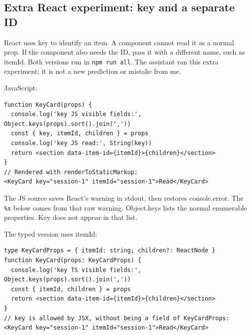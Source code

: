 \documentclass[
  10pt,
  a4paper,
]{article}
\begin{document}
\subsection{Extra React experiment: key and a separate
ID}\label{extra-react-experiment-key-and-a-separate-id}

React uses key to identify an item. A component cannot read it as a
normal prop. If the component also needs the ID, pass it with a
different name, such as itemId. Both versions run in
\texttt{npm run all}. The assistant ran this extra experiment; it is not
a new prediction or mistake from me.


JavaScript:

\begin{minipage}{\linewidth}

\begin{lstlisting}
function KeyCard(props) {
  console.log('key JS visible fields:', Object.keys(props).sort().join(','))
  const { key, itemId, children } = props
  console.log('key JS read:', String(key))
  return <section data-item-id={itemId}>{children}</section>
}
// Rendered with renderToStaticMarkup:
<KeyCard key="session-1" itemId="session-1">Read</KeyCard>
\end{lstlisting}

\end{minipage}\par

The JS source saves React's warning in stdout, then restores
console.error. The \texttt{\%s} below comes from that raw warning.
Object.keys lists the normal enumerable properties. Key does not appear
in that list.

The typed version uses itemId:

\begin{minipage}{\linewidth}

\begin{lstlisting}
type KeyCardProps = { itemId: string; children?: ReactNode }
function KeyCard(props: KeyCardProps) {
  console.log('key TS visible fields:', Object.keys(props).sort().join(','))
  const { itemId, children } = props
  return <section data-item-id={itemId}>{children}</section>
}
// key is allowed by JSX, without being a field of KeyCardProps:
<KeyCard key="session-1" itemId="session-1">Read</KeyCard>
\end{lstlisting}

\end{minipage}\par
\end{document}
